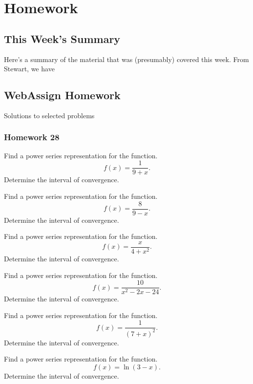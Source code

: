 \chapter{Homework}
\section{This Week's Summary}
Here's a summary of the material that was (presumably) covered this week.
From Stewart, we have
\subsection{}

\section{WebAssign Homework}
Solutions to selected problems
\subsection{Homework 28}
\begin{problem}[WebAssign HW 28, \# 1]
Find a power series representation for the function.
\[
f(x)=\frac{1}{9+x}.
\]
Determine the interval of convergence.
\end{problem}

\begin{problem}[WebAssign HW 28, \# 2]
Find a power series representation for the function.
\[
f(x)=\frac{8}{9-x}.
\]
Determine the interval of convergence.
\end{problem}

\begin{problem}[WebAssign HW 28, \# 3]
Find a power series representation for the function.
\[
f(x)=\frac{x}{4+x^2}.
\]
Determine the interval of convergence.
\end{problem}

\begin{problem}[WebAssign HW 28, \# 4]
Find a power series representation for the function.
\[
f(x)=\frac{10}{x^2-2x-24}.
\]
Determine the interval of convergence.
\end{problem}

\begin{problem}[WebAssign HW 28, \# 5]
Find a power series representation for the function.
\[
f(x)=\frac{1}{(7+x)^2}.
\]
Determine the interval of convergence.
\end{problem}

\begin{problem}[WebAssign HW 28, \# 6]
Find a power series representation for the function.
\[
f(x)=\ln(3-x).
\]
Determine the interval of convergence.
\end{problem}

